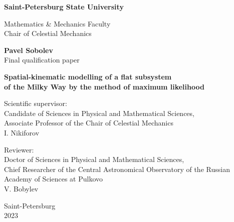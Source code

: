 \documentclass[a4paper, oneside, 14pt]{article}
\newcommand{\npar}{\par\vspace{\baselineskip}}
\begin{document}
\begin{titlepage}
  \begin{center}
    {
      \Large
      \textbf{Saint-Petersburg State University}

      Mathematics \& Mechanics Faculty\\
      Chair of Celestial Mechanics\par
    }

    \vfill

    {
      \Large
      \textbf{Pavel Sobolev}\\
      Final qualification paper\par
    }

    \vspace{0.5cm}

    {
      \LARGE
      \textbf{Spatial-kinematic modelling of a flat subsystem \\ of the Milky Way by the method of maximum likelihood}\par
    }

    \vfill

    \begin{flushright}
      \large

      Scientific supervisor:\\
      Candidate of Sciences in Physical and Mathematical Sciences,\\
      Associate Professor of the Chair of Celestial Mechanics\\
      I. Nikiforov\npar

      Reviewer:\\
      Doctor of Sciences in Physical and Mathematical Sciences,\\
      Chief Researcher of the Central Astronomical Observatory of the Russian Academy of Sciences at Pulkovo\\
      V. Bobylev\par

    \end{flushright}

    \vfill

    {
      \Large
      Saint-Petersburg\\
      2023\par
    }
  \end{center}
\end{titlepage}

\hypertarget{toc}{}
\tableofcontents

\setcounter{page}{3}

\newpage
\end{document}

